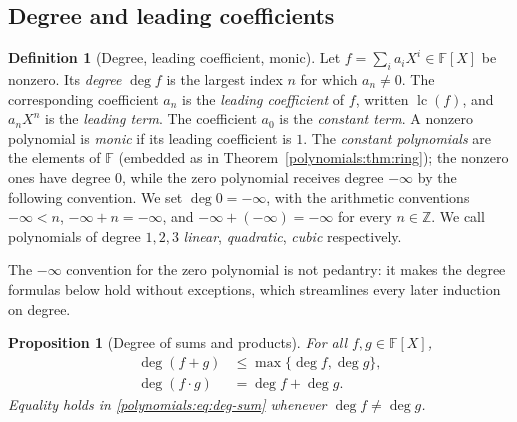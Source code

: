 \documentclass[11pt,a4paper]{article}
\newtheorem{proposition}[theorem]{Proposition}
\theoremstyle{definition}
\newtheorem{definition}[theorem]{Definition}
\theoremstyle{remark}
\newcommand{\Z}{\ensuremath{\mathbb{Z}}}
\newcommand{\F}{\ensuremath{\mathbb{F}}}
\begin{document}
\subsection{Degree and leading coefficients}
\label{polynomials:subsec:degree}

\begin{definition}[Degree, leading coefficient, monic]\label{polynomials:def:degree}
Let \(f = \sum_{i} a_i X^i \in \F[X]\) be nonzero. Its \emph{degree}
\(\deg f\) is the largest index \(n\) for which \(a_n \neq 0\). The corresponding
coefficient \(a_n\) is the \emph{leading coefficient} of \(f\), written
\(\operatorname{lc}(f)\), and \(a_n X^n\) is the \emph{leading term}. The
coefficient \(a_0\) is the \emph{constant term}. A nonzero polynomial is
\emph{monic} if its leading coefficient is \(1\). The \emph{constant polynomials}
are the elements of \(\F\) (embedded as in
Theorem~\ref{polynomials:thm:ring}); the nonzero ones have degree \(0\), while
the zero polynomial receives degree \(-\infty\) by the following convention. We set \(\deg 0 = -\infty\), with the arithmetic conventions \(-\infty < n\),
\(-\infty + n = -\infty\), and \(-\infty + (-\infty) = -\infty\) for every
\(n \in \Z\). We call polynomials of degree \(1, 2, 3\) \emph{linear},
\emph{quadratic}, \emph{cubic} respectively.
\end{definition}

The \(-\infty\) convention for the zero polynomial is not pedantry: it makes the
degree formulas below hold without exceptions, which streamlines every later
induction on degree.

\begin{proposition}[Degree of sums and products]\label{polynomials:prop:degree}
For all \(f, g \in \F[X]\),
\begin{align}
  \deg(f + g) &\le \max\{\deg f, \deg g\},
    \label{polynomials:eq:deg-sum}\\
  \deg(f \cdot g) &= \deg f + \deg g.
    \label{polynomials:eq:deg-prod}
\end{align}
Equality holds in \eqref{polynomials:eq:deg-sum} whenever
\(\deg f \neq \deg g\).
\end{proposition}
\end{document}
